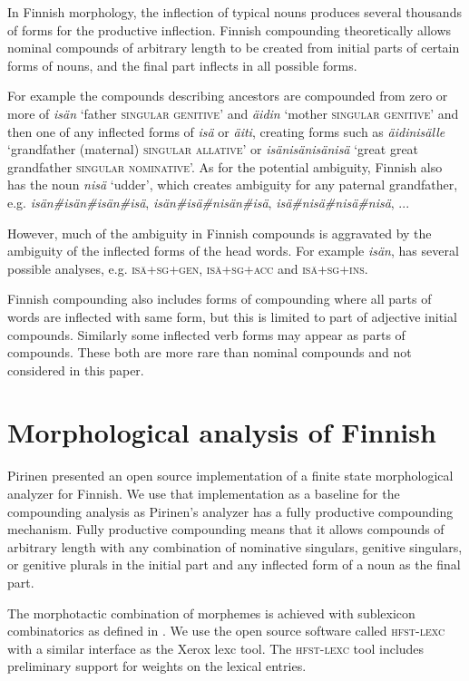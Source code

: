 \documentclass[postprint]{flammie}
\begin{document}
In Finnish morphology, the inflection of typical nouns produces
several thousands of forms for the productive inflection. Finnish
compounding theoretically allows nominal compounds of arbitrary length
to be created from initial parts of certain forms of nouns, and the
final part inflects in all possible forms.

For example the compounds describing ancestors are compounded from
zero or more of \emph{isän} `father \textsc{singular genitive}' and
\emph{äidin} `mother \textsc{singular genitive}' and then one of any
inflected forms of \emph{isä} or \emph{äiti}, creating forms such as
\emph{äidinisälle} `grandfather (maternal) \textsc{singular allative}'
or \emph{isänisänisänisä} `great great grandfather \textsc{singular
  nominative}'.  As for the potential ambiguity, Finnish also has the
noun \emph{nisä} `udder', which creates ambiguity for any paternal
grandfather, e.g. \emph{isän\#isän\#isän\#isä},
\emph{isän\#isä\#nisän\#isä}, \emph{isä\#nisä\#nisä\#nisä}, ...

However, much of the ambiguity in Finnish compounds is aggravated by
the ambiguity of the inflected forms of the head words. For example
\emph{isän}, has several possible analyses,
e.g. \textsc{isä+sg+gen}, \textsc{isä+sg+acc} and \textsc{isä+sg+ins}.

Finnish compounding also includes forms of compounding where all parts of
words are inflected with same form, but this is limited to part of adjective
initial compounds. Similarly some inflected verb forms may appear as parts
of compounds. These both are more rare than nominal compounds \cite{visk}
and not considered in this paper.

\section{Morphological analysis of Finnish}
\label{Sect2}

Pirinen \cite{pirinen/2008} presented an open source
implementation of a finite state morphological analyzer for Finnish.
We use that implementation as a baseline for the compounding analysis
as Pirinen's analyzer has a fully productive compounding
mechanism. Fully productive compounding means that it allows compounds
of arbitrary length with any combination of nominative singulars,
genitive singulars, or genitive plurals in the initial part and any
inflected form of a noun as the final part.

The morphotactic combination of morphemes is achieved with sublexicon
combinatorics as defined in \cite{beesley/2003}. We use the open source
software called \textsc{hfst-lexc} with a similar interface as the
Xerox lexc tool. The \textsc{hfst-lexc} tool includes preliminary
support for weights on the lexical entries.
\end{document}
